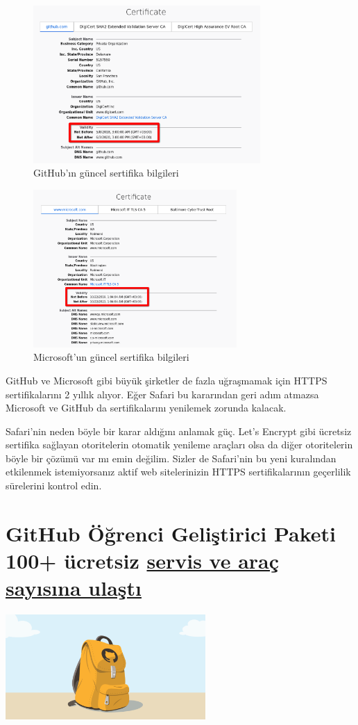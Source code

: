 \documentclass[11pt]{article}
\begin{document}
\begin{figure}[htbp]
\centering
\includegraphics[height=6cm]{gorseller/safari-sertifika-github.png}
\caption{GitHub'ın güncel sertifika bilgileri}
\end{figure}
\begin{figure}[htbp]
\centering
\includegraphics[height=6cm]{gorseller/safari-sertifika-microsoft.png}
\caption{Microsoft'un güncel sertifika bilgileri}
\end{figure}
\newpage

GitHub ve Microsoft gibi büyük şirketler de fazla uğraşmamak için HTTPS
sertifikalarını 2 yıllık alıyor. Eğer Safari bu kararından geri adım atmazsa
Microsoft ve GitHub da sertifikalarını yenilemek zorunda kalacak.

Safari'nin neden böyle bir karar aldığını anlamak güç. Let's Encrypt gibi
ücretsiz sertifika sağlayan otoritelerin otomatik yenileme araçları olsa da
diğer otoritelerin böyle bir çözümü var mı emin değilim. Sizler de Safari'nin
bu yeni kuralından etkilenmek istemiyorsanız aktif web sitelerinizin HTTPS
sertifikalarının geçerlilik sürelerini kontrol edin.
\section{GitHub Öğrenci Geliştirici Paketi 100+ ücretsiz \href{https://github.blog/2020-02-25-over-100-partners-to-help-you-succeed-with-the-github-student-developer-pack/}{servis ve araç sayısına ulaştı}}
\label{sec:org21aa480}
\begin{center}
\includegraphics[height=4cm]{gorseller/github-ogrenci-gelistirici-paketi.png}
\end{center}
\end{document}
